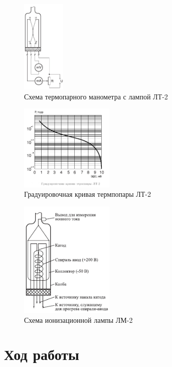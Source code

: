 \documentclass[a4paper]{article}
\begin{document}
	\begin{figure}[h!]
		\centering
		\includegraphics[height=45mm]{pic3.png}
		\caption{Схема термопарного манометра с лампой ЛТ-2 \label{overflow}}
	\end{figure}	
	\begin{figure}[h!]
		\centering
		\includegraphics[width=45mm]{pic4.png}
		\caption{Градуировочная кривая термпопары ЛТ-2 \label{overflow}}
	\end{figure}
	\begin{figure}[h!]
		\centering
		\includegraphics[width=45mm]{pic5.png}
		\caption{Схема ионизационной лампы ЛМ-2 \label{overflow}}
	\end{figure}
	
	\newpage
	\section{Ход работы}
\end{document}
